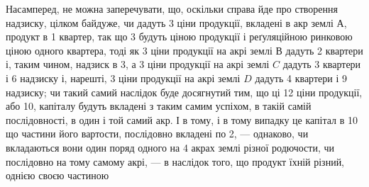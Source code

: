 Насамперед, не можна заперечувати, що, оскільки справа йде про створення
надзиску, цілком байдуже, чи дадуть 3 ціни продукції, вкладені в акр
землі $А$, продукт в 1 квартер, так що 3 будуть ціною продукції і реґуляційною
ринковою ціною одного квартера, тоді як 3 ціни продукції на акрі землі
$В$ дадуть 2 квартери і, таким чином, надзиск в 3, а 3 ціни продукції
на акрі землі $C$ дадуть 3 квартери і 6 надзиску і, нарешті, 3 ціни
продукції на акрі землі $D$ дадуть 4 квартери і 9 надзиску; чи такий самий
наслідок буде досягнутий тим, що ці 12 ціни продукції, або 10,
капіталу будуть вкладені з таким самим успіхом, в такій самій послідовності,
в один і той самий акр. І в тому, і в тому випадку це капітал в 10
що частини його вартости, послідовно вкладені по 2, — однаково, чи вкладаються
вони один поряд одного на 4 акрах землі різної родючости, чи послідовно на
тому самому акрі, — в наслідок того, що продукт їхній різний, однією своєю частиною
\parbreak{}  %
